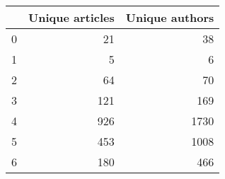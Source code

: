 \begin{tabular}{lrr}
\toprule
{} &  Unique articles &  Unique authors \\
\midrule
0 &               21 &              38 \\
1 &                5 &               6 \\
2 &               64 &              70 \\
3 &              121 &             169 \\
4 &              926 &            1730 \\
5 &              453 &            1008 \\
6 &              180 &             466 \\
\bottomrule
\end{tabular}
